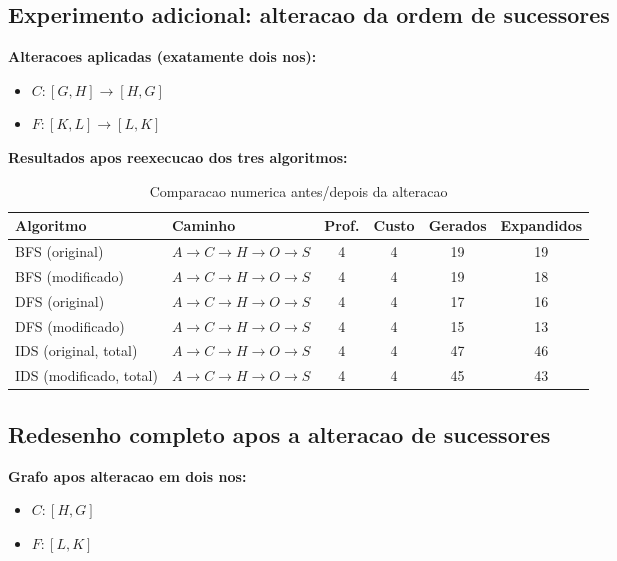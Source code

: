 \subsection{Experimento adicional: alteracao da ordem de sucessores}
\textbf{Alteracoes aplicadas (exatamente dois nos):}
\begin{itemize}[leftmargin=1.5em]
  \item $C: [G,H] \rightarrow [H,G]$
  \item $F: [K,L] \rightarrow [L,K]$
\end{itemize}

\textbf{Resultados apos reexecucao dos tres algoritmos:}
\begin{table}[H]
\centering
\small
\setlength{\tabcolsep}{4.2pt}
\renewcommand{\arraystretch}{1.15}
\begin{tabular}{>{\raggedright\arraybackslash}p{2.2cm} >{\raggedright\arraybackslash}p{4.9cm} c c c c}
\toprule
Algoritmo & Caminho & Prof. & Custo & Gerados & Expandidos \\
\midrule
BFS (original) & $A \rightarrow C \rightarrow H \rightarrow O \rightarrow S$ & 4 & 4 & 19 & 19 \\
BFS (modificado) & $A \rightarrow C \rightarrow H \rightarrow O \rightarrow S$ & 4 & 4 & 19 & 18 \\
\midrule
DFS (original) & $A \rightarrow C \rightarrow H \rightarrow O \rightarrow S$ & 4 & 4 & 17 & 16 \\
DFS (modificado) & $A \rightarrow C \rightarrow H \rightarrow O \rightarrow S$ & 4 & 4 & 15 & 13 \\
\midrule
IDS (original, total) & $A \rightarrow C \rightarrow H \rightarrow O \rightarrow S$ & 4 & 4 & 47 & 46 \\
IDS (modificado, total) & $A \rightarrow C \rightarrow H \rightarrow O \rightarrow S$ & 4 & 4 & 45 & 43 \\
\bottomrule
\end{tabular}
\caption{Comparacao numerica antes/depois da alteracao}
\end{table}

\subsection{Redesenho completo apos a alteracao de sucessores}
\textbf{Grafo apos alteracao em dois nos:}
\begin{itemize}[leftmargin=1.5em]
  \item $C: [H,G]$
  \item $F: [L,K]$
\end{itemize}

